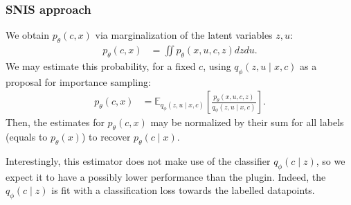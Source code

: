 \subsubsection{SNIS approach}
We obtain $p_\theta(c, x)$ via marginalization of the latent variables $z, u$:
\begin{align}
    p_\theta(c, x)
    &= 
    \iint
    p_\theta(x, u, c, z) dzdu.
\end{align}
We may estimate this probability, for a fixed $c$, using $q_\phi(z, u \mid x, c)$ as a proposal for importance sampling:
\begin{align}
p_\theta(c, x)
    &=
    \mathbb{E}
    _{q_\phi(z, u \mid x, c)}
    \left[
        \frac{p_\theta(x, u, c, z)}{q_\phi(z, u \mid x, c)}
    \right].
\end{align}
Then, the estimates for $p_\theta(c, x)$ may be normalized by their sum for all labels (equals to $p_\theta(x)$) to recover $p_\theta(c \mid x)$. 

Interestingly, this estimator does not make use of the classifier $q_\phi(c \mid z)$, so we expect it to have a possibly lower performance than the plugin. Indeed, the $q_\phi(c \mid z)$ is fit with a classification loss towards the labelled datapoints. 

